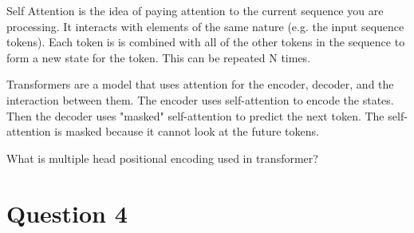 \documentclass{article}
\begin{document}
Self Attention is the idea of paying attention to the current sequence you are processing. It interacts with elements of the same nature (e.g. the input sequence tokens). Each token is is combined with all of the other tokens in the sequence to form a new state for the token. This can be repeated N times.   


Transformers are a model that uses attention for the encoder, decoder, and the interaction between them. The encoder uses self-attention to encode the states. Then the decoder uses "masked" self-attention to predict the next token. The self-attention is masked because it cannot look at the future tokens. 


What is multiple head positional encoding used in transformer? 



\section{Question 4}
\end{document}
